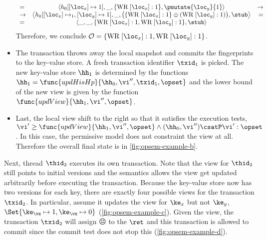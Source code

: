 \begin{itemize}
{\begin{equation}
\begin{array}{lcr}
=&\left \langle h_0[[\loc_x] \mapsto 1], \_, \{\text{WR}\; [\loc_x]: 1\}, 
\pmutate{\loc_y}{1} \right\rangle 
&\rightarrow\\ 
\rightarrow & 
\left\langle h_0[[\loc_x] \mapsto_1, [\loc_y] \mapsto 1], \_, \big( \{\text{WR}\;[\loc_x]:1\} \oplus  (\text{WR}\;[\loc_y]: 1) \big), 
\stub \right\rangle & = \\
=& \left \langle \_, \_, \{\text{WR}\;[\loc_x]: 1, \text{WR}\;[\loc_y]:1 \}, \stub \right\rangle
\end{array}
\end{equation}
Therefore, we conclude $\mathcal{O} = \{\text{WR}\; [\loc_x] : 1, \text{WR}\;[\loc_y]:1\}$.
}
\item 
The transaction throws away the local snapshot and commits the fingerprints to the key-value store.
A fresh transaction identifier \( \txid_{1} \) is picked.
The new key-value store \( \hh_{1} \) is determined by the functions $\hh_{1} = \func{updHisHp}{\hh_0, \vi'',\txid_1, \opset}$ and the lower bound of the new view is given by the function \( \func{updView}{\hh_1, \vi'' ,\opset}\).
\item Last, the local view shift to the right so that it satisfies the execution tests, \( \vi' \geq \func{updView}{\hh_1, \vi'' ,\opset} \land (\hh_{0}, \vi'') \csatP \vi' : \opset \).
In this case, the permissive model does not constraint the view at all.
Therefore the overall final state is in \cref{fig:opsem-example-b}.
\end{itemize}

Next, thread $\thid_2$ executes its own transaction.
Note that the view for \( \thid_2\) still points to initial versions and the semantics allows the view get updated arbitrarily before executing the transaction.
Because the key-value store now has two versions for each key, there are exactly four possible views for the transaction \( \txid_{2} \).
In particular, assume it updates the view for \( \ke_{x} \) but not \( \ke_y \), \ie \( \Set{\ke_\vx \mapsto 1, \ke_\vx \mapsto 0} \) (\cref{fig:opsem-example-c}).
Given the view, the transaction \( \txid_{2} \) will assign \(\sadface\) to the \( \ret\) and this transaction is allowed to commit since the commit test does not stop this (\cref{fig:opsem-example-d}).

